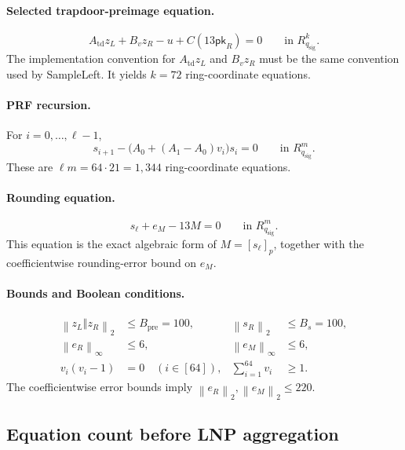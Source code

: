 \documentclass[11pt,a4paper]{article}
\newcommand{\Rsig}{R_{q_{\mathrm{sig}}}}
\newcommand{\norm}[1]{\left\lVert #1\right\rVert}
\newcommand{\concat}{\mathbin\Vert}
\newcommand{\pk}{\mathsf{pk}}
\begin{document}
\paragraph{Selected trapdoor-preimage equation.}
\begin{equation}
  A_{\mathrm{td}}z_L+B_vz_R-u+C(13\pk_R)=0
  \qquad\text{in }\Rsig^k.
  \label{eq:R2-native}
\end{equation}
The implementation convention for \(A_{\mathrm{td}}z_L\) and \(B_vz_R\)
must be the same convention used by \textsf{SampleLeft}.  It yields \(k=72\)
ring-coordinate equations.

\paragraph{PRF recursion.}
For \(i=0,\ldots,\ell-1\),
\begin{equation}
  s_{i+1}-\bigl(A_0+(A_1-A_0)v_i\bigr)s_i=0
  \qquad\text{in }\Rsig^m.
  \label{eq:R3-native}
\end{equation}
These are \(\ell m=64\cdot21=1{,}344\) ring-coordinate equations.

\paragraph{Rounding equation.}
\begin{equation}
  s_{\ell}+e_M-13M=0
  \qquad\text{in }\Rsig^m.
  \label{eq:R4-native}
\end{equation}
This equation is the exact algebraic form of \(M=[s_\ell]_p\), together with
the coefficientwise rounding-error bound on \(e_M\).

\paragraph{Bounds and Boolean conditions.}
\begin{align}
  \norm{z_L\concat z_R}_2&\le B_{\mathrm{pre}}=100,
  &\norm{s_R}_2&\le B_s=100,\label{eq:app-norm1}\\
  \norm{e_R}_\infty&\le6,
  &\norm{e_M}_\infty&\le6,\label{eq:app-norm2}\\
  v_i(v_i-1)&=0\quad(i\in[64]),
  &\sum_{i=1}^{64}v_i&\ge1.\label{eq:v-nonzero}
\end{align}
The coefficientwise error bounds imply
\(\norm{e_R}_2,\norm{e_M}_2\le220\).

\subsection{Equation count before LNP aggregation}
\end{document}
